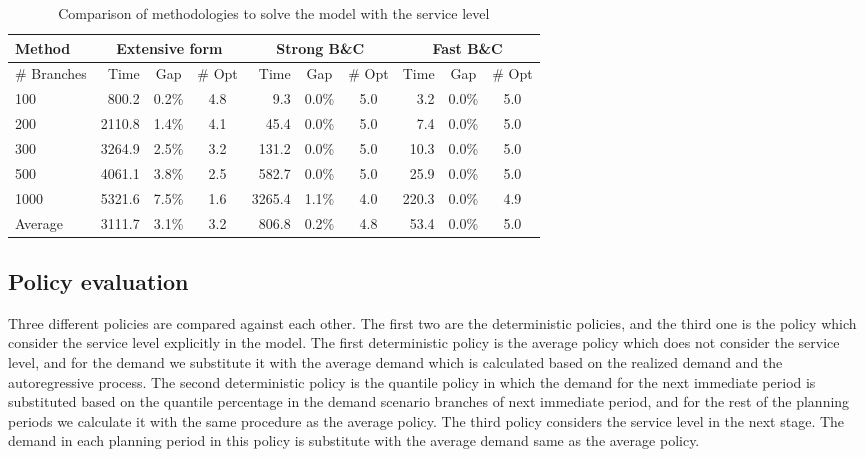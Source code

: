 \documentclass[10pt]{article}
\begin{document}
\begin{table}[]
\caption{Comparison of methodologies to solve the model with the service level}
\label{tab:MethodologyCompare}
\begin{tabular}{lrccrccrcc}
Method      & \multicolumn{3}{c}{Extensive form} & \multicolumn{3}{c}{Strong B\&C} & \multicolumn{3}{c}{Fast B\&C} \\ \hline
\# Branches & Time       & Gap       & \# Opt    & Time      & Gap     & \# Opt   & Time    & Gap     & \# Opt   \\ \hline
100         & 800.2      & 0.2\%     & 4.8       & 9.3       & 0.0\%   & 5.0      & 3.2     & 0.0\%   & 5.0      \\
200         & 2110.8     & 1.4\%     & 4.1       & 45.4      & 0.0\%   & 5.0      & 7.4     & 0.0\%   & 5.0      \\
300         & 3264.9     & 2.5\%     & 3.2       & 131.2     & 0.0\%   & 5.0      & 10.3    & 0.0\%   & 5.0      \\
500         & 4061.1     & 3.8\%     & 2.5       & 582.7     & 0.0\%   & 5.0      & 25.9    & 0.0\%   & 5.0      \\
1000        & 5321.6     & 7.5\%     & 1.6       & 3265.4    & 1.1\%   & 4.0      & 220.3   & 0.0\%   & 4.9      \\ \hline
Average     & 3111.7     & 3.1\%     & 3.2       & 806.8     & 0.2\%   & 4.8      & 53.4    & 0.0\%   & 5.0     
\end{tabular}

\end{table}


\subsection{Policy evaluation}

Three different policies are compared against each other. The first two are the deterministic policies, and the third one is the policy which consider the service level explicitly in the model. The first deterministic policy is the average policy which does not consider the service level, and for the demand we substitute it with the average demand which is calculated based on the realized demand and the autoregressive process.
The second deterministic policy is the quantile policy in which the demand for the next immediate period is substituted based on the quantile percentage in the demand scenario branches of next immediate period, and for the rest of the planning periods we calculate it with the same procedure as the average policy.
The third policy considers the service level in the next stage. The demand in each planning period in this policy is substitute with the average demand same as the average policy.
\end{document}
